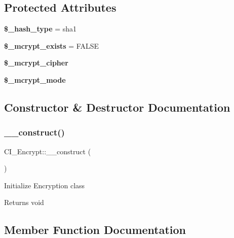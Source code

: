 \subsection*{Protected Attributes}
\begin{DoxyCompactItemize}
\item 
\mbox{\label{class_c_i___encrypt_a41367dd1fc9b24f0acd03933922241f0}} 
{\bfseries \$\+\_\+hash\+\_\+type} = \textquotesingle{}sha1\textquotesingle{}
\item 
\mbox{\label{class_c_i___encrypt_a04e7975f5d5526d69d87105f04b1cd76}} 
{\bfseries \$\+\_\+mcrypt\+\_\+exists} = F\+A\+L\+SE
\item 
\mbox{\label{class_c_i___encrypt_ac8dddcca9fd45dc551e765b6e6715d45}} 
{\bfseries \$\+\_\+mcrypt\+\_\+cipher}
\item 
\mbox{\label{class_c_i___encrypt_a946a9bf8fc3462e9940b22c083a30da0}} 
{\bfseries \$\+\_\+mcrypt\+\_\+mode}
\end{DoxyCompactItemize}


\subsection{Constructor \& Destructor Documentation}
\mbox{\label{class_c_i___encrypt_a17a94bcccf4727fcdda961b98525e116}} 
\subsubsection{\texorpdfstring{\+\_\+\+\_\+construct()}{\_\_construct()}}
{\footnotesize\ttfamily C\+I\+\_\+\+Encrypt\+::\+\_\+\+\_\+construct (\begin{DoxyParamCaption}{ }\end{DoxyParamCaption})}

Initialize Encryption class

\begin{DoxyReturn}{Returns}
void 
\end{DoxyReturn}


\subsection{Member Function Documentation}
\mbox{\label{class_c_i___encrypt_a18c358ed9b8f8f9d67876299bccc157a}} 
